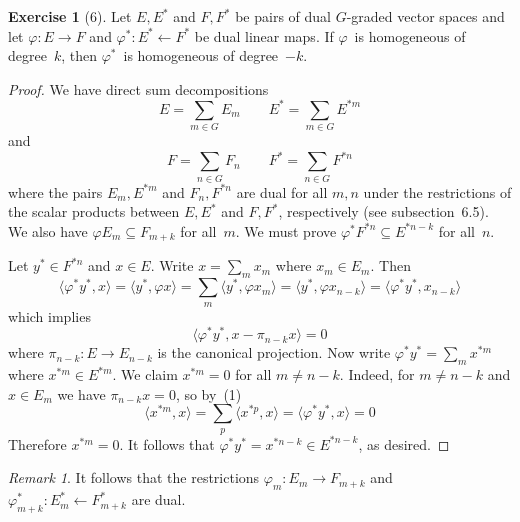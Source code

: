 \documentclass[letterpaper,12pt]{article}
\newcommand{\from}{\leftarrow}
\newcommand{\sprod}[2]{\langle#1,#2\rangle}
\theoremstyle{definition}
\newtheorem*{exer}{Exercise}
\theoremstyle{remark}
\newtheorem*{rmk}{Remark}
\begin{document}
\begin{exer}[6]
Let \(E,E^*\) and \(F,F^*\) be pairs of dual \(G\)-graded vector spaces and let \(\varphi:E\to F\) and \(\varphi^*:E^*\from F^*\) be dual linear maps. If \(\varphi\)~is homogeneous of degree~\(k\), then \(\varphi^*\)~is homogeneous of degree~\(-k\).
\end{exer}
\begin{proof}
We have direct sum decompositions
\[E=\sum_{m\in G}E_m\qquad E^*=\sum_{m\in G}E^{*m}\]
and
\[F=\sum_{n\in G}F_n\qquad F^*=\sum_{n\in G}F^{*n}\]
where the pairs \(E_m,E^{*m}\) and \(F_n,F^{*n}\) are dual for all \(m,n\) under the restrictions of the scalar products between \(E,E^*\) and \(F,F^*\), respectively (see subsection~6.5). We also have \(\varphi E_m\subseteq F_{m+k}\) for all~\(m\). We must prove \(\varphi^* F^{*n}\subseteq E^{*n-k}\) for all~\(n\).

Let \(y^*\in F^{*n}\) and \(x\in E\). Write \(x=\sum_m x_m\) where \(x_m\in E_m\). Then
\[\sprod{\varphi^* y^*}{x}=\sprod{y^*}{\varphi x}=\sum_m\sprod{y^*}{\varphi x_m}=\sprod{y^*}{\varphi x_{n-k}}=\sprod{\varphi^* y^*}{x_{n-k}}\]
which implies
\[\sprod{\varphi^* y^*}{x-\pi_{n-k}x}=0\tag{1}\]
where \(\pi_{n-k}:E\to E_{n-k}\) is the canonical projection. Now write \(\varphi^* y^*=\sum_m x^{*m}\) where \(x^{*m}\in E^{*m}\). We claim \(x^{*m}=0\) for all \(m\ne n-k\). Indeed, for \(m\ne n-k\) and \(x\in E_m\) we have \(\pi_{n-k}x=0\), so by~(1)
\[\sprod{x^{*m}}{x}=\sum_p\sprod{x^{*p}}{x}=\sprod{\varphi^* y^*}{x}=0\]
Therefore \(x^{*m}=0\). It follows that \(\varphi^* y^*=x^{*n-k}\in E^{*n-k}\), as desired.
\end{proof}
\begin{rmk}
It follows that the restrictions \(\varphi_m:E_m\to F_{m+k}\) and \(\varphi^*_{m+k}:E^*_m\from F^*_{m+k}\) are dual.
\end{rmk}
\end{document}
